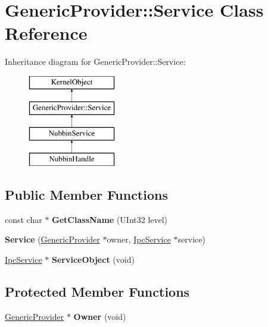 \hypertarget{class_generic_provider_1_1_service}{}\section{Generic\+Provider\+:\+:Service Class Reference}
\label{class_generic_provider_1_1_service}
Inheritance diagram for Generic\+Provider\+:\+:Service\+:\begin{figure}[H]
\begin{center}
\leavevmode
\includegraphics[height=4.000000cm]{class_generic_provider_1_1_service}
\end{center}
\end{figure}
\subsection*{Public Member Functions}
\begin{DoxyCompactItemize}
\item 
\mbox{\label{class_generic_provider_1_1_service_afe0d1d0d957d864d211ff01d2e609775}} 
const char $\ast$ {\bfseries Get\+Class\+Name} (U\+Int32 level)
\item 
\mbox{\label{class_generic_provider_1_1_service_a0d686afaa06768388fa6397615e08e67}} 
{\bfseries Service} (\hyperlink{class_generic_provider}{Generic\+Provider} $\ast$owner, \hyperlink{class_ipc_service}{Ipc\+Service} $\ast$service)
\item 
\mbox{\label{class_generic_provider_1_1_service_a0b45611b49b8155d29ca7d9cdf4f5151}} 
\hyperlink{class_ipc_service}{Ipc\+Service} $\ast$ {\bfseries Service\+Object} (void)
\end{DoxyCompactItemize}
\subsection*{Protected Member Functions}
\begin{DoxyCompactItemize}
\item 
\mbox{\label{class_generic_provider_1_1_service_a373afd7fd4098259ea4d750747f4651e}} 
\hyperlink{class_generic_provider}{Generic\+Provider} $\ast$ {\bfseries Owner} (void)
\end{DoxyCompactItemize}
